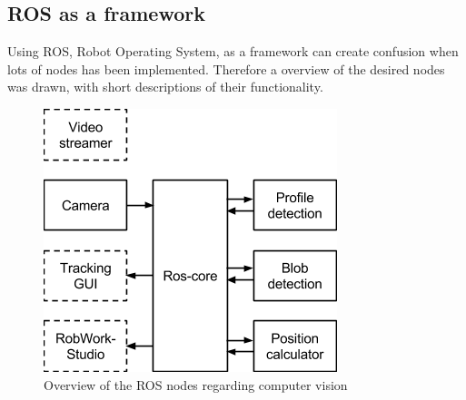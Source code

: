 \subsection{ROS as a framework}
Using ROS, Robot Operating System, as a framework can create confusion when lots of nodes has been implemented. Therefore a overview of the desired nodes was drawn, with short descriptions of their functionality.
\begin{figure}[H]
	\centering
	\includegraphics{imgs/ros_setup}
	\caption{Overview of the ROS nodes regarding computer vision}
\end{figure} 

